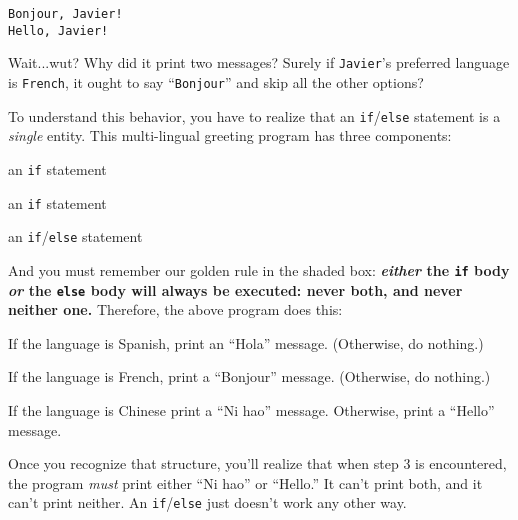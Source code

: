 \begin{Verbatim}[fontsize=\small,samepage=true,frame=leftline,framesep=5mm,framerule=1mm]
Bonjour, Javier!
Hello, Javier!
\end{Verbatim}

Wait...wut? Why did it print two messages? Surely if \texttt{Javier}'s
preferred language is \texttt{French}, it ought to say ``\texttt{Bonjour}'' and
skip all the other options?

To understand this behavior, you have to realize that an
\texttt{if}/\texttt{else} statement is a \textit{single} entity. This
multi-lingual greeting program has three components:

\begin{samepage}
\begin{compactenum}
\item an \texttt{if} statement
\item an \texttt{if} statement
\item an \texttt{if}/\texttt{else} statement
\end{compactenum}
\end{samepage}


And you must remember our golden rule in the shaded box:
\textbf{\textit{either} the \texttt{if} body \textit{or} the \texttt{else} body
will always be executed: never both, and never neither one.} Therefore, the
above program does this:

\begin{samepage}
\begin{compactenum}
\item If the language is Spanish, print an ``Hola'' message. (Otherwise, do
nothing.)
\item If the language is French, print a ``Bonjour'' message. (Otherwise, do
nothing.)
\item If the language is Chinese print a ``Ni hao'' message. Otherwise, print a
``Hello'' message.
\end{compactenum}
\end{samepage}

Once you recognize that structure, you'll realize that when step 3 is
encountered, the program \textit{must} print either ``Ni hao'' or ``Hello.'' It
can't print both, and it can't print neither. An \texttt{if}/\texttt{else} just
doesn't work any other way.


